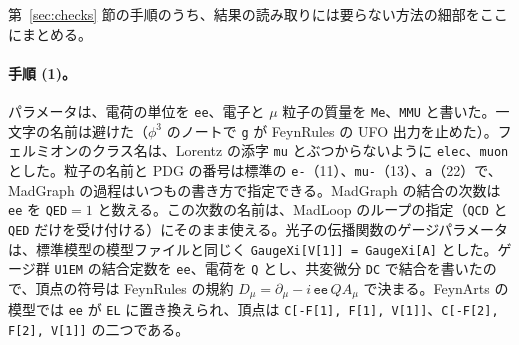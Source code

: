 \documentclass[a4paper,10pt]{ltjsarticle}
\begin{document}
第~\ref{sec:checks} 節の手順のうち、結果の読み取りには要らない方法の細部をここにまとめる。

\paragraph{手順 (1)。}パラメータは、電荷の単位を \texttt{ee}、電子と $\mu$ 粒子の質量を \texttt{Me}、\texttt{MMU} と書いた。一文字の名前は避けた（$\phi^3$ のノートで \texttt{g} が FeynRules の UFO 出力を止めた）。フェルミオンのクラス名は、Lorentz の添字 \texttt{mu} とぶつからないように \texttt{elec}、\texttt{muon} とした。粒子の名前と PDG の番号は標準の \texttt{e-}（11）、\texttt{mu-}（13）、\texttt{a}（22）で、MadGraph の過程はいつもの書き方で指定できる。MadGraph の結合の次数は \texttt{ee} を \texttt{QED}$=1$ と数える。この次数の名前は、MadLoop のループの指定（\texttt{QCD} と \texttt{QED} だけを受け付ける）にそのまま使える。光子の伝播関数のゲージパラメータは、標準模型の模型ファイルと同じく \texttt{GaugeXi[V[1]] = GaugeXi[A]} とした。ゲージ群 \texttt{U1EM} の結合定数を \texttt{ee}、電荷を \texttt{Q} とし、共変微分 \texttt{DC} で結合を書いたので、頂点の符号は FeynRules の規約 $D_\mu=\partial_\mu-i\,\texttt{ee}\,Q A_\mu$ で決まる。FeynArts の模型では \texttt{ee} が \texttt{EL} に置き換えられ、頂点は \texttt{C[-F[1], F[1], V[1]]}、\texttt{C[-F[2], F[2], V[1]]} の二つである。
\end{document}
